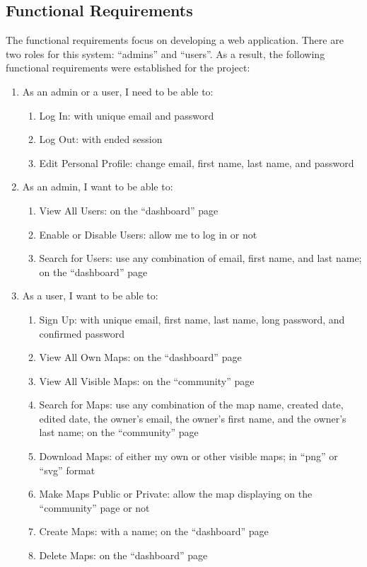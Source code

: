 \subsection{Functional Requirements}
The functional requirements focus on developing a web application. There are two roles for this system: ``admins'' and ``users''. As a result, the following functional requirements were established for the project:
\begin{enumerate}
  \item As an admin or a user, I need to be able to:
  \begin{enumerate}
    \item Log In: with unique email and password
    \item Log Out: with ended session
    \item Edit Personal Profile: change email, first name, last name, and password
  \end{enumerate}
  \item As an admin, I want to be able to:
  \begin{enumerate}
    \item View All Users: on the ``dashboard'' page
    \item Enable or Disable Users: allow me to log in or not
    \item Search for Users: use any combination of email, first name, and last name; on the ``dashboard'' page
  \end{enumerate}
  \item As a user, I want to be able to:
  \begin{enumerate}
    \item Sign Up: with unique email, first name, last name, long password, and confirmed password
    \item View All Own Maps: on the ``dashboard'' page
    \item View All Visible Maps: on the ``community'' page
    \item Search for Maps: use any combination of the map name, created date, edited date, the owner's email, the owner's first name, and the owner's last name; on the ``community'' page
    \item Download Maps: of either my own or other visible maps; in ``png'' or ``svg'' format
    \item Make Maps Public or Private: allow the map displaying on the ``community'' page or not
    \item Create Maps: with a name; on the ``dashboard'' page
    \item Delete Maps: on the ``dashboard'' page

\end{enumerate}
\end{enumerate}
